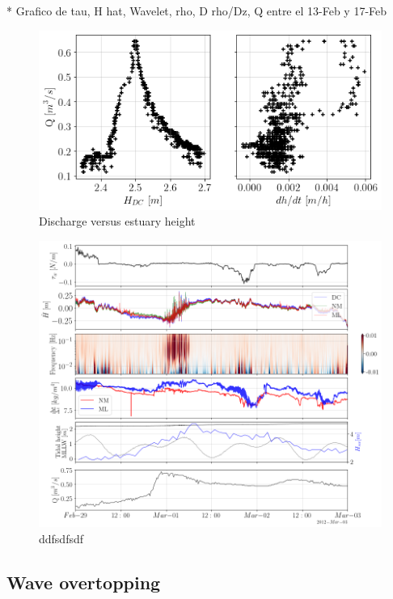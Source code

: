 \documentclass[tesis.tex]{subfiles}
\begin{document}
* Grafico de tau, H hat, Wavelet, rho, D rho/Dz, Q entre el 13-Feb y 17-Feb

\begin{figure}[h!]
    \centering
    \includegraphics[width=\textwidth]{Imagenes/qh.png}
    \caption{Discharge versus estuary height }
    \label{fig:qh}
\end{figure}


\begin{figure}[h!]
    \centering
    \includegraphics[width=\textwidth]{Imagenes/mix_q.png}
    \caption{ddfsdfsdf }
    \label{fig:mix_q}
\end{figure}

\subsection{Wave overtopping}
\end{document}
